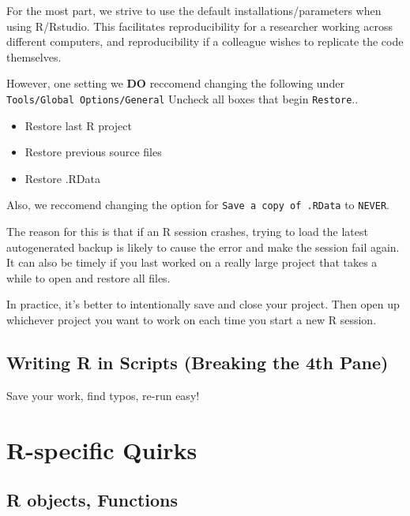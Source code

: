 \documentclass[
]{book}
\begin{document}
For the most part, we strive to use the default installations/parameters when using R/Rstudio. This facilitates reproducibility for a researcher working across different computers, and reproducibility if a colleague wishes to replicate the code themselves.

However, one setting we \textbf{DO} reccomend changing the following under \texttt{Tools/Global\ Options/General} Uncheck all boxes that begin \texttt{Restore}..

\begin{itemize}
\item
  Restore last R project
\item
  Restore previous source files
\item
  Restore .RData
\end{itemize}

Also, we reccomend changing the option for \texttt{Save\ a\ copy\ of\ .RData} to \texttt{NEVER}.

The reason for this is that if an R session crashes, trying to load the latest autogenerated backup is likely to cause the error and make the session fail again. It can also be timely if you last worked on a really large project that takes a while to open and restore all files.

In practice, it's better to intentionally save and close your project. Then open up whichever project you want to work on each time you start a new R session.

\hypertarget{writing-r-in-scripts-breaking-the-4th-pane}{%
\subsection{Writing R in Scripts (Breaking the 4th Pane)}\label{writing-r-in-scripts-breaking-the-4th-pane}}

Save your work, find typos, re-run easy!

\hypertarget{r-specific-quirks}{%
\section*{R-specific Quirks}\label{r-specific-quirks}}

\hypertarget{r-objects-functions}{%
\subsection*{R objects, Functions}\label{r-objects-functions}}
\end{document}
